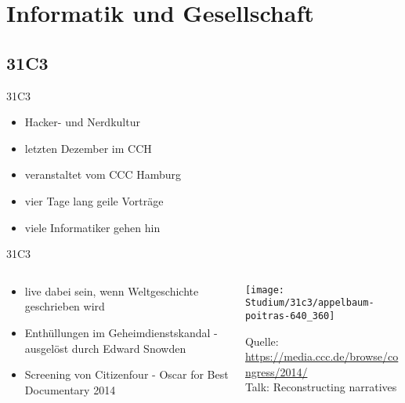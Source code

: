 \documentclass{beamer}
\begin{document}
\section{Informatik und Gesellschaft}
\subsection{31C3}
\begin{frame}{31C3}
  \begin{itemize}
    \item Hacker- und Nerdkultur
    \item letzten Dezember im CCH
    \item veranstaltet vom CCC Hamburg
    \item vier Tage lang geile Vorträge
    \item viele Informatiker gehen hin
  \end{itemize}
\end{frame}
\begin{frame}{31C3}%
  \begin{columns}[T]
    \begin{column}{0.48\textwidth}
      \begin{itemize}
        \item live dabei sein, wenn Weltgeschichte geschrieben wird
        \item Enthüllungen im Geheimdienstskandal - ausgelöst durch Edward Snowden
        \item Screening von Citizenfour - Oscar for Best Documentary 2014
      \end{itemize}
    \end{column}
    \hfill
    \begin{column}{0.5\textwidth}
      \centering
      \texttt{[image: Studium/31c3/appelbaum-poitras-640\_360]}

      Quelle: \url{https://media.ccc.de/browse/congress/2014/} \\
      Talk: Reconstructing narratives
    \end{column}
  \end{columns}  
\end{frame}
\end{document}
